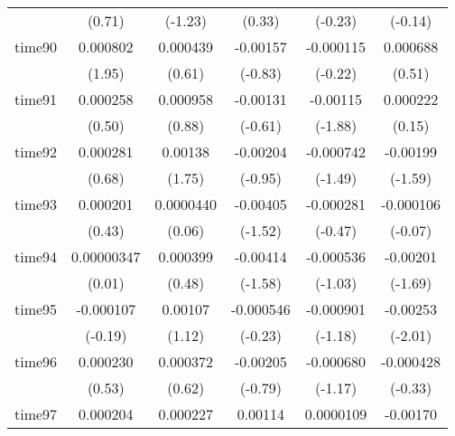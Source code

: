 \begin{table}[htbp]
\begin{tabular}{l*{5}{c}}
            &      (0.71)         &     (-1.23)         &      (0.33)         &     (-0.23)         &     (-0.14)         \\
time90      &    0.000802         &    0.000439         &    -0.00157         &   -0.000115         &    0.000688         \\
            &      (1.95)         &      (0.61)         &     (-0.83)         &     (-0.22)         &      (0.51)         \\
time91      &    0.000258         &    0.000958         &    -0.00131         &    -0.00115         &    0.000222         \\
            &      (0.50)         &      (0.88)         &     (-0.61)         &     (-1.88)         &      (0.15)         \\
time92      &    0.000281         &     0.00138         &    -0.00204         &   -0.000742         &    -0.00199         \\
            &      (0.68)         &      (1.75)         &     (-0.95)         &     (-1.49)         &     (-1.59)         \\
time93      &    0.000201         &   0.0000440         &    -0.00405         &   -0.000281         &   -0.000106         \\
            &      (0.43)         &      (0.06)         &     (-1.52)         &     (-0.47)         &     (-0.07)         \\
time94      &  0.00000347         &    0.000399         &    -0.00414         &   -0.000536         &    -0.00201         \\
            &      (0.01)         &      (0.48)         &     (-1.58)         &     (-1.03)         &     (-1.69)         \\
time95      &   -0.000107         &     0.00107         &   -0.000546         &   -0.000901         &    -0.00253\sym{*}  \\
            &     (-0.19)         &      (1.12)         &     (-0.23)         &     (-1.18)         &     (-2.01)         \\
time96      &    0.000230         &    0.000372         &    -0.00205         &   -0.000680         &   -0.000428         \\
            &      (0.53)         &      (0.62)         &     (-0.79)         &     (-1.17)         &     (-0.33)         \\
time97      &    0.000204         &    0.000227         &     0.00114         &   0.0000109         &    -0.00170         \\

\end{tabular}
\end{table}
